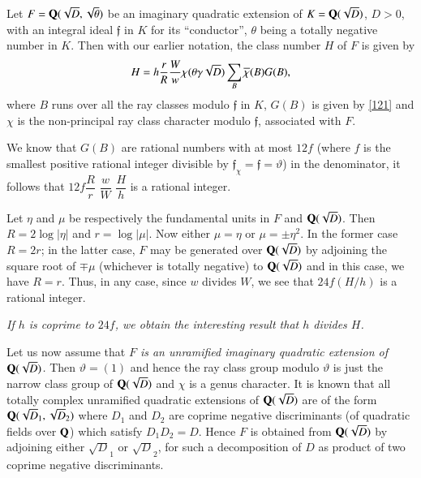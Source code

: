 \begin{proposition}\label{prop17}
Let $F=\mathbf{Q}(\sqrt{D},\sqrt{\theta})$ be an imaginary quadratic
extension of $K=\mathbf{Q}(\sqrt{D})$, $D>0$, with an integral ideal
$\mathfrak{f}$ in $K$ for its ``conductor'', $\theta$ being a totally
negative number in $K$. Then with our earlier notation, the class
number $H$ of $F$ is given by 
$$
H=h\frac{r}{R}\frac{W}{w}\chi(\theta\gamma\sqrt{D})\sum_{B}\overline{\chi}(B)G(B),
$$\pageoriginale
where $B$ runs over all the ray classes modulo $\mathfrak{f}$ in $K$,
$G(B)$ is given by \eqref{121} and $\chi$ is the non-principal ray
class character modulo $\mathfrak{f}$, associated with $F$.
\end{proposition}

\begin{remark*}
We know that $G(B)$ are rational numbers with at most $12f$ (where $f$
is the smallest positive rational integer divisible by
$\mathfrak{f}_{\chi}=\mathfrak{f}=\vartheta$) in the denominator, it
follows that $12f\dfrac{R}{r}$ $\dfrac{w}{W}$ $\dfrac{H}{h}$ is a
rational integer.
\end{remark*}

Let $\eta$ and $\mu$ be respectively the fundamental units in $F$ and
$\mathbf{Q}(\sqrt{D})$. Then $R=2\log |\eta|$ and $r=\log|\mu|$. Now either
$\mu=\eta$ or $\mu=\pm \eta^{2}$. In the former case $R=2r$; in the
latter case, $F$ may be generated over $\mathbf{Q}(\sqrt{D})$ by adjoining
the square root of $\mp \mu$ (whichever is totally negative) to
$\mathbf{Q}(\sqrt{D})$ and in this case, we have $R=r$. Thus, in any case,
since $w$ divides $W$, we see that $24f(H/h)$ is a rational integer.

{\em If $h$ is coprime to $24f$, we obtain the interesting result that
  $h$ divides $H$.}

Let us now assume that {\em $F$ is an unramified imaginary quadratic
  extension of $\mathbf{Q}(\sqrt{D})$.} Then $\vartheta=(1)$ and hence the
ray class group modulo $\vartheta$ is just the narrow class group of
$\mathbf{Q}(\sqrt{D})$ and $\chi$ is a genus character. It is known that all
totally complex unramified quadratic extensions of $\mathbf{Q}(\sqrt{D})$ are
of the form $\mathbf{Q}(\sqrt{D}_{1},\sqrt{D}_{2})$ where $D_{1}$ and $D_{2}$
are coprime negative discriminants (of quadratic fields over $\mathbf{Q}$)
which satisfy $D_{1}D_{2}=D$. Hence $F$ is obtained from
$\mathbf{Q}(\sqrt{D})$ by adjoining either $\sqrt{D}_{1}$ or $\sqrt{D}_{2}$,
for such a decomposition of $D$ as product of two coprime negative
discriminants. 

